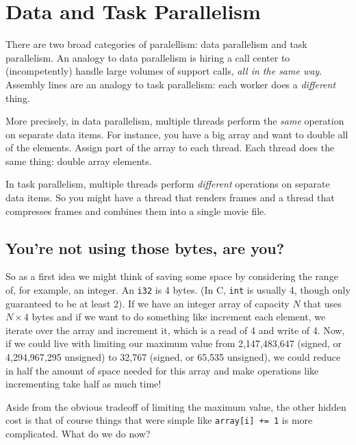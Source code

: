 





\section*{Data and Task Parallelism}
There are two broad categories of paralellism: data parallelism and
task parallelism. An analogy to data parallelism is hiring a call
center to (incompetently) handle large volumes of support calls,
\emph{all in the same way}. Assembly lines are an analogy to task
parallelism: each worker does a \emph{different} thing.

More precisely, in data parallelism, multiple threads perform the
\emph{same} operation on separate data items. For instance, you have a
big array and want to double all of the elements. Assign part of the
array to each thread. Each thread does the same thing: double array
elements.

In task parallelism, multiple threads perform \emph{different}
operations on separate data items. So you might have a thread that
renders frames and a thread that compresses frames and combines them
into a single movie file.


\subsection*{You're not using those bytes, are you?}
So as a first idea we might think of saving some space by considering the range of, for example, an integer. An \texttt{i32} is 4 bytes. (In C, \texttt{int} is usually 4, though only guaranteed to be at least 2). If we have an integer array of capacity $N$ that uses $N \times 4$ bytes and if we want to do something like increment each element, we iterate over the array and increment it, which is a read of 4 and write of 4. Now, if we could live with limiting our maximum value from 2,147,483,647 (signed, or 4,294,967,295 unsigned) to 32,767  (signed, or 65,535 unsigned), we could reduce in half the amount of space needed for this array and make operations like incrementing take half as much time!

Aside from the obvious tradeoff of limiting the maximum value, the other hidden cost is that of course things that were simple like \texttt{array[i] += 1} is more complicated. What do we do now?


